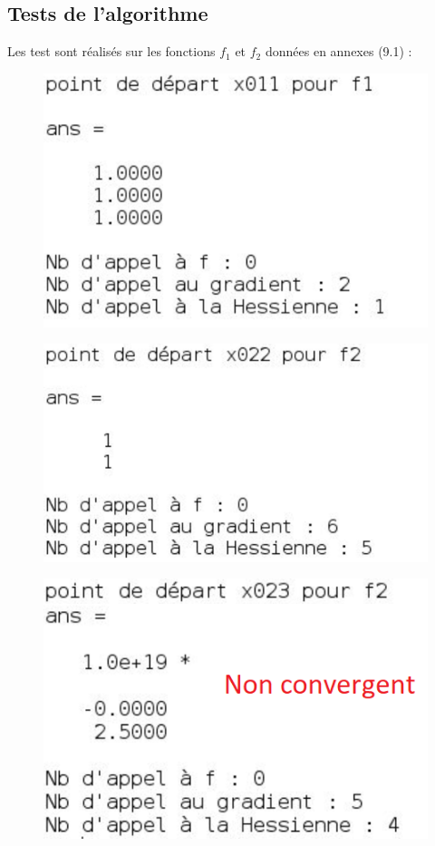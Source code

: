 \documentclass[a4paper,12pt]{article}
\theoremstyle{break}
\begin{document}
\subsection{Tests de l'algorithme}
Les test sont réalisés sur les fonctions $f_1$ et $f_2$ données en annexes (9.1) :
\begin{figure}[htbp]
	\centering
		\includegraphics{img/test1_newton.PNG}
\end{figure}
\begin{figure}[htbp]
	\centering
		\includegraphics{img/test2_newton.PNG}
\end{figure}
\begin{figure}[htbp]
	\centering
		\includegraphics{img/test3_newton.PNG}
\end{figure}
\end{document}
